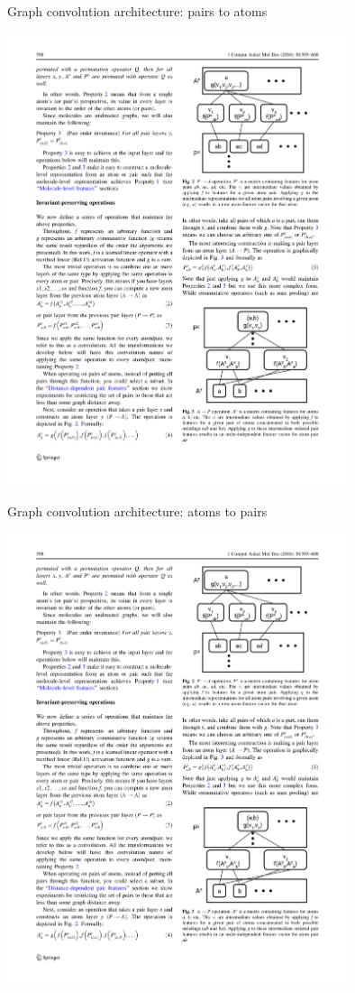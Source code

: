 \documentclass[xetex,compress]{beamer}
\begin{document}
\begin{frame}{Graph convolution architecture: pairs to atoms}
  \begin{center}
    \includegraphics[width=0.75\textwidth]{./figures/gc_fig2.pdf}
  \end{center}
\end{frame}

\begin{frame}{Graph convolution architecture: atoms to pairs}
  \begin{center}
    \includegraphics[width=0.75\textwidth]{./figures/gc_fig3.pdf}
  \end{center}
\end{frame}
\end{document}

